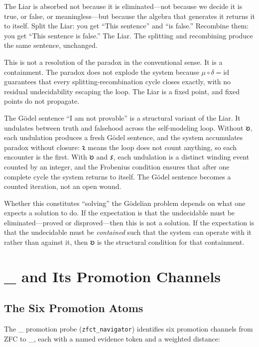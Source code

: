 \documentclass[12pt,twoside]{book}
\theoremstyle{definition}
\newcommand{\ZFCt}{\text{ZFC}_{\tau}}
\newcommand{\moebius}{\mu \circ \delta = \mathrm{id}}
\begin{document}
The Liar is absorbed not because it is eliminated---not because we decide it is true, or
false, or meaningless---but because the algebra that generates it returns it to itself.
Split the Liar: you get ``This sentence'' and ``is false.'' Recombine them: you get ``This
sentence is false.'' The Liar. The splitting and recombining produce the same sentence,
unchanged.

This is not a resolution of the paradox in the conventional sense. It is a containment.
The paradox does not explode the system because $\moebius$ guarantees that every
splitting-recombination cycle closes exactly, with no residual undecidability escaping the
loop. The Liar is a fixed point, and fixed points do not propagate.

The G\"{o}del sentence ``I am not provable'' is a structural variant of the Liar. It
undulates between truth and falsehood across the self-modeling loop. Without 𐑹, each
undulation produces a fresh G\"{o}del sentence, and the system accumulates paradox without
closure: 𐑷 means the loop does not count anything, so each encounter is the first. With 𐑹
and 𐑭, each undulation is a distinct winding event counted by an integer, and the Frobenius
condition ensures that after one complete cycle the system returns to itself. The G\"{o}del
sentence becomes a counted iteration, not an open wound.

Whether this constitutes ``solving'' the G\"{o}delian problem depends on what one expects a
solution to do. If the expectation is that the undecidable must be eliminated---proved or
disproved---then this is not a solution. If the expectation is that the undecidable must be
\emph{contained} such that the system can operate with it rather than against it, then 𐑹
is the structural condition for that containment.

\chapter{\ZFCt{} and Its Promotion Channels}

\section{The Six Promotion Atoms}

The \ZFCt{} promotion probe (\texttt{zfct\_navigator}) identifies six promotion channels
from ZFC to \ZFCt, each with a named evidence token and a weighted distance:
\end{document}
